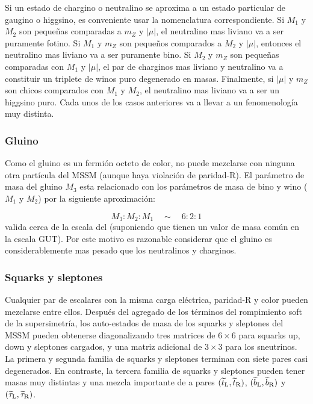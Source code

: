 Si un estado de chargino o neutralino se aproxima a un estado particular de
gaugino o higgsino, es conveniente usar la nomenclatura correspondiente. Si
$M_1$ y $M_2$ son pequeñas comparadas a $m_Z$ y $|\mu|$, el neutralino mas
liviano va a ser puramente fotino. Si $M_1$ y $m_Z$ son pequeños comparados a
$M_2$ y $|\mu|$, entonces el neutralino mas liviano va a ser puramente bino. Si
$M_2$ y $m_Z$ son pequeñas comparadas con $M_1$ y $|\mu|$, el par de charginos
mas liviano y neutralino va a constituir un triplete de winos puro degenerado en
masas. Finalmente, si $|\mu|$ y $m_Z$ son chicos comparados con $M_1$ y $M_2$,
el neutralino mas liviano va a ser un higgsino puro. Cada unos de los casos
anteriores va a llevar a un fenomenología muy distinta.


\subsubsection{Gluino}

Como el gluino es un fermión octeto de color, no puede mezclarse con ninguna
otra partícula del MSSM (aunque haya violación de paridad-R). El parámetro de
masa del gluino $M_3$ esta relacionado con los parámetros de masa de bino y wino
($M_1$ y $M_2$) por la siguiente aproximación:

\begin{equation}
  M_3 : M_2 : M_1 \quad \sim \quad 6 : 2 : 1
\end{equation}
%
valida cerca de la escala del {\tev} (suponiendo que tienen un valor de masa común
en la escala GUT). Por este motivo es razonable considerar que el gluino es
considerablemente mas pesado que los neutralinos y charginos.


\subsubsection{Squarks y sleptones}

Cualquier par de escalares con la misma carga eléctrica, paridad-R y color
pueden mezclarse entre ellos. Después del agregado de los términos del
rompimiento soft de la supersimetría, los auto-estados de masa de los squarks y
sleptones del MSSM pueden obtenerse diagonalizando tres matrices de $6\times6$
para squarks up, down y sleptones cargados, y una matriz adicional de $3\times
3$ para los sneutrinos. La primera y segunda familia de squarks y sleptones
terminan con siete pares casi degenerados. En contraste, la tercera familia de
squarks y sleptones pueden tener masas muy distintas y una mezcla importante de
a pares $(\widetilde{t}_{\mathrm{L}}, \widetilde{t}_{\mathrm{R}})$, $(\widetilde{b}_{\mathrm{L}}, \widetilde{b}_{\mathrm{R}})$ y $(\widetilde{\tau}_{\mathrm{L}}, \widetilde{\tau}_{\mathrm{R}})$.


